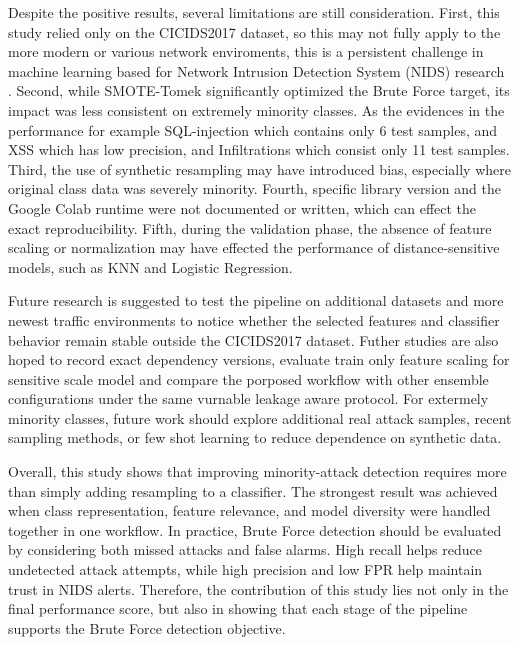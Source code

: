 \documentclass[12pt,a4paper]{article}
\begin{document}
Despite the positive results, several limitations are still consideration. First, this study relied only on the CICIDS2017 dataset, so this may not fully apply to the more modern or various network enviroments, this is a persistent challenge in machine learning based for Network Intrusion Detection System (NIDS) research \parencite{sarhan2021standard,wardana2024collaborative,gu2025semisupervised}. Second, while SMOTE-Tomek significantly optimized the Brute Force target, its impact was less consistent on extremely minority classes. As the evidences in the performance for example SQL-injection which contains only 6 test samples, and XSS which has low precision, and Infiltrations which consist only 11 test samples. Third, the use of synthetic resampling may have introduced bias, especially where original class data was severely minority. Fourth, specific library version and the Google Colab runtime were not documented or written, which can effect the exact reproducibility. Fifth, during the validation phase, the absence of feature scaling or normalization may have effected the performance of distance-sensitive models, such as KNN and Logistic Regression.

Future research is suggested to test the pipeline on additional datasets and more newest traffic environments to notice whether the selected features and classifier behavior remain stable outside the CICIDS2017 dataset. Futher studies are also hoped to record exact dependency versions, evaluate train only feature scaling for sensitive scale model and compare the porposed workflow with other ensemble configurations under the same vurnable leakage aware protocol. For extermely minority classes, future work should explore additional real attack samples, recent sampling methods, or few shot learning to reduce dependence on synthetic data.

Overall, this study shows that improving minority-attack detection requires more than simply adding resampling to a classifier. The strongest result was achieved when class representation, feature relevance, and model diversity were handled together in one workflow. In practice, Brute Force detection should be evaluated by considering both missed attacks and false alarms. High recall helps reduce undetected attack attempts, while high precision and low FPR help maintain trust in NIDS alerts. Therefore, the contribution of this study lies not only in the final performance score, but also in showing that each stage of the pipeline supports the Brute Force detection objective.
\end{document}

